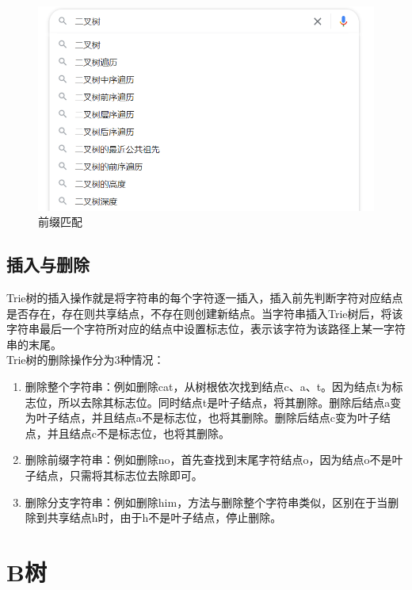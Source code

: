 \begin{figure}[H]
	\centering
	\includegraphics[scale=0.8]{img/C17/17-4/1.png}
	\caption{前缀匹配}
\end{figure}

\subsection{插入与删除}

Trie树的插入操作就是将字符串的每个字符逐一插入，插入前先判断字符对应结点是否存在，存在则共享结点，不存在则创建新结点。当字符串插入Trie树后，将该字符串最后一个字符所对应的结点中设置标志位，表示该字符为该路径上某一字符串的末尾。 \\

Trie树的删除操作分为3种情况：

\begin{enumerate}
	\item 删除整个字符串：例如删除cat，从树根依次找到结点c、a、t。因为结点t为标志位，所以去除其标志位。同时结点t是叶子结点，将其删除。删除后结点a变为叶子结点，并且结点a不是标志位，也将其删除。删除后结点c变为叶子结点，并且结点c不是标志位，也将其删除。

	\item 删除前缀字符串：例如删除no，首先查找到末尾字符结点o，因为结点o不是叶子结点，只需将其标志位去除即可。

	\item 删除分支字符串：例如删除him，方法与删除整个字符串类似，区别在于当删除到共享结点h时，由于h不是叶子结点，停止删除。
\end{enumerate}

\newpage

\section{B树}

